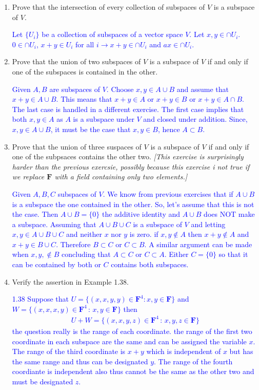 \documentclass[10pt,a4paper]{report}
\newcommand{\BLUE}[1]{\textcolor{blue}{#1}}
\newcommand{\F}{\textbf{F}}
\begin{document}
\begin{enumerate}
\item Prove that the intersection of every collection of subspaces of $V$ is a subspace of $V$.

\BLUE{Let $\{U_i\}$ be a collection of subspaces of a vector space $V$.  Let $x,y \in \cap U_i$.  $0 \in \cap U_i$, $x+y \in U_i$ for all $i \to x+y \in \cap U_i$ and $ax \in \cap U_i$.
}

\item Prove that the union of two subspaces of $V$ is a subspace of $V$ if and only if one of the subspaces is contained in the other.

\BLUE{Given $A,B$ are subspaces of $V$. Choose $x,y \in A \cup B$ and assume that $x+y \in A \cup B$.  This means that $x+y \in A$ or $x+y \in B$ or $x+y \in A\cap B$. The last case is handled in a different exercise.  The first case implies that both $x, y \in A$ as $A$ is a subspace under $V$ and closed under addition.  Since, $x,y \in A\cup B$, it must be the case that $x,y \in B$, hence $A \subset B$.  
}

\item Prove that the union of three suspaces of $V$ is a subspace of $V$ if and only if one of the subpsaces contains the other two.  \textit{[This exercise is surprisingly harder than the previous exercsie, possibly because this exercise i not true if we replace $\F$ with a field containing only two elements.]}

\BLUE{Given $A,B,C$ subspaces of $V$. We know from previous exercises that if $A \cup B$ is a subspace the one contained in the other.  So, let's assume that this is not the case.  Then $A\cup B = \{0\}$ the additive identity and $A \cup B$ does NOT make a subspace.  Assuming that $A\cup B \cup C$ is a subspace of $V$ and letting $x,y \in A\cup B \cup C$ and neither $x$ nor $y$ is zero.  if $x,y \not \in A$ then $x+y \not \in A$ and $x+y \in B \cup C$.  Therefore $B\subset C$ or $C \subset B$.  A similar argument can be made when $x,y, \not \in B$ concluding that $A \subset C$ or $C \subset A$.  Either $C = \{0\}$ so that it can be contained by both or $C$ contains both subspaces.
}

\item Verify the assertion in Example 1.38.

\BLUE{1.38 Suppose that $U =\{(x,x,y,y) \in \F^4 : x,y \in \F\}$ and $W=\{(x,x,x,y) \in \F^4\,:\, x,y \in \F\}$ then
\begin{align*}
	U+W = \{(x,x,y,z) \in \F^4\,:\, x,y,z \in \F\}
\end{align*}the question really is the range of each coordinate.  the range of the first two coordinate in each subspace are the same and can be assigned the variable $x$.  The range of the third coordinate is $x+y$ which is independent of $x$ but has the same range and thus can be designated $y$.  The range of the fourth coordiante is independent also thus cannot be the same as the other two and must be designated $z$.
}


\end{enumerate}
\end{document}
